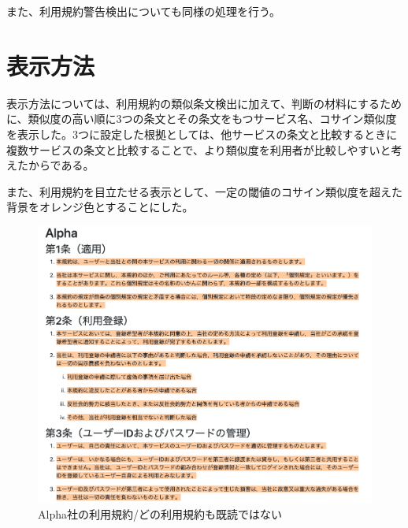 また、利用規約警告検出についても同様の処理を行う。

\section{表示方法}
表示方法については、利用規約の類似条文検出に加えて、判断の材料にするために、類似度の高い順に3つの条文とその条文をもつサービス名、コサイン類似度を表示した。3つに設定した根拠としては、他サービスの条文と比較するときに複数サービスの条文と比較することで、より類似度を利用者が比較しやすいと考えたからである。

また、利用規約を目立たせる表示として、一定の閾値のコサイン類似度を超えた背景をオレンジ色とすることにした。
\begin{figure}[h]
  \begin{center}
      \includegraphics[width=16cm]{img/alpha.png}
      \caption{Alpha社の利用規約/どの利用規約も既読ではない}
      \label{img:Alpha社の利用規約/どの利用規約も既読ではない}
  \end{center}
\end{figure}
